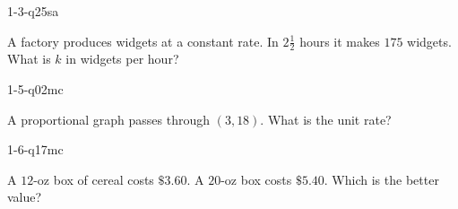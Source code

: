 
\begin{practiceQuestion}{1-3-q25}{sa}
\begin{questionText}
A factory produces widgets at a constant rate. In $2\frac{1}{2}$ hours it makes $175$ widgets. What is $k$ in widgets per hour?
\end{questionText}
\end{practiceQuestion}

\begin{practiceQuestion}{1-5-q02}{mc}
\begin{questionText}
A proportional graph passes through $(3, 18)$. What is the unit rate?
\end{questionText}
\end{practiceQuestion}

\begin{practiceQuestion}{1-6-q17}{mc}
\begin{questionText}
A $12$-oz box of cereal costs $\$3.60$. A $20$-oz box costs $\$5.40$. Which is the better value?
\end{questionText}
\end{practiceQuestion}

